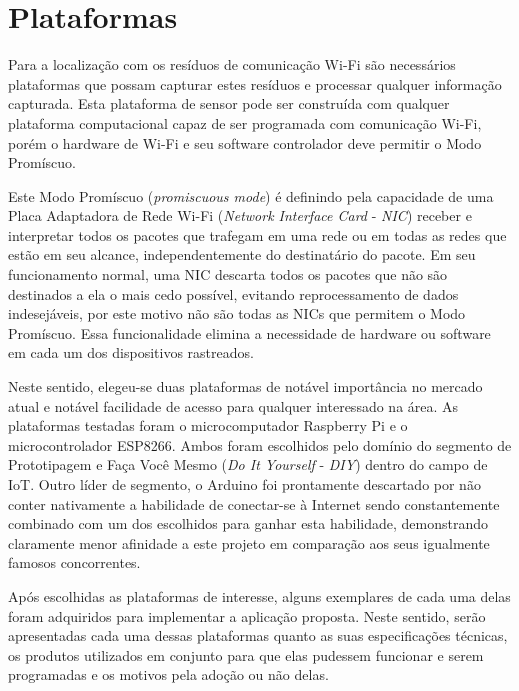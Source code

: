 \chapter{Plataformas}
\label{chap:Plataformas}

Para a localização com os resíduos de comunicação Wi-Fi são necessários
plataformas que possam capturar estes resíduos e processar qualquer informação
capturada. Esta plataforma de sensor pode ser construída com
qualquer plataforma computacional capaz de ser programada com comunicação
Wi-Fi, porém o hardware de Wi-Fi e seu software
controlador deve permitir o Modo Promíscuo.

Este Modo Promíscuo (\emph{promiscuous mode}) é definindo pela capacidade de uma
Placa Adaptadora de Rede Wi-Fi (\emph{Network Interface Card} -
\emph{NIC}) receber e interpretar todos os pacotes que trafegam em uma rede ou
em todas as redes que estão em seu alcance, independentemente do destinatário do
pacote. Em seu funcionamento normal, uma NIC descarta todos os pacotes que
não são destinados a ela o mais cedo possível, evitando reprocessamento de
dados indesejáveis, por este motivo não são todas as NICs que permitem o
Modo Promíscuo. Essa funcionalidade elimina a necessidade de hardware ou
software em cada um dos dispositivos rastreados.

Neste sentido, elegeu-se duas plataformas de notável importância no mercado atual
e notável facilidade de acesso para qualquer interessado na área. As plataformas
testadas foram o microcomputador Raspberry Pi e o microcontrolador
ESP8266. Ambos  foram escolhidos pelo domínio do segmento de Prototipagem
e Faça Você Mesmo  (\emph{Do It Yourself} - \emph{DIY}) dentro do campo de IoT.
Outro líder de segmento, o Arduino foi prontamente descartado por não
conter nativamente a habilidade de conectar-se à Internet sendo
constantemente combinado com um dos escolhidos para ganhar esta habilidade,
demonstrando claramente menor afinidade a este projeto em comparação aos seus
igualmente famosos concorrentes.

Após escolhidas as plataformas de interesse, alguns exemplares de cada uma delas
foram adquiridos para implementar a aplicação proposta. Neste sentido, serão
apresentadas cada uma dessas plataformas quanto as suas especificações técnicas,
os produtos utilizados em conjunto para que elas pudessem funcionar e serem
programadas e os motivos pela adoção ou não delas.
